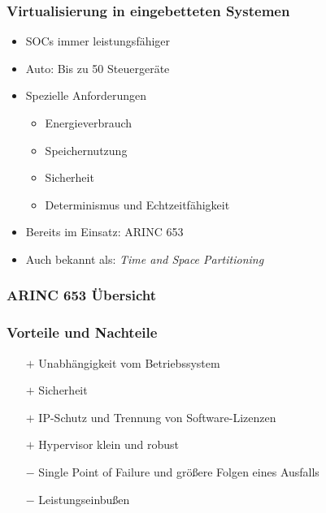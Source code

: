 \documentclass[]{beamer}
\newcommand{\inputImage}[1]{}
\begin{document}
\begin{frame}
\frametitle{Virtualisierung in eingebetteten Systemen}
    \begin{itemize}
        \item SOCs immer leistungsfähiger
        \item Auto: Bis zu 50 Steuergeräte
        \item Spezielle Anforderungen
        \begin{itemize}
            \item Energieverbrauch
            \item Speichernutzung
            \item Sicherheit
            \item Determinismus und Echtzeitfähigkeit
        \end{itemize}
        \item Bereits im Einsatz: ARINC 653
        \item Auch bekannt als: \emph{Time and Space Partitioning}
    \end{itemize}
\end{frame}


\begin{frame}
\frametitle{ARINC 653 Übersicht}
    \begin{figure}[ht]
        \centering
        \resizebox{0.65\linewidth}{!}{\inputImage{arinc653.dia}}
        \label{fig:arinc_653}
    \end{figure}
\end{frame}



\begin{frame}
\frametitle{Vorteile und Nachteile}
    \begin{itemize}
        \item[$ + $] Unabhängigkeit vom Betriebssystem
        \item[$ + $] Sicherheit
        \item[$ + $] IP-Schutz und Trennung von Software-Lizenzen
        \item[$ + $] Hypervisor klein und robust

        \item[$ - $] Single Point of Failure und größere Folgen eines Ausfalls
        \item[$ - $] Leistungseinbußen
    \end{itemize}
\end{frame}
\end{document}
